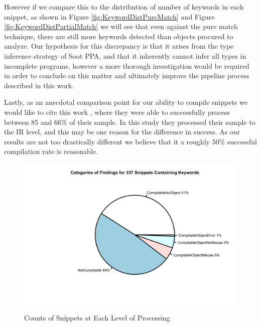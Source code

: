\documentclass[10pt, conference]{IEEEtran}
\begin{document}
However if we compare this to the distribution of number of keywords in each snippet, as shown in Figure \ref{fig:KeywordDistPureMatch} and Figure \ref{fig:KeywordDistPartialMatch} we will see that even against the pure match technique, there are still more keywords detected than objects procured to analyze. Our hypothesis for this discrepancy is that it arises from the type inference strategy of Soot PPA, and that it inherently cannot infer all types in incomplete programs, however a more thorough investigation would be required in order to conclude on this matter and ultimately improve the pipeline process described in this work. 

Lastly, as an anecdotal comparison point for our ability to compile snippets we would like to cite this work \cite{7958574}, where they were able to successfully process between 85 and 66\% of their sample. In this study they processed their sample to the IR level, and this may be one reason for the difference in success. As our results are not too drastically different we believe that it a roughly 50\% successful compilation rate is reasonable.

\begin{figure}[h]
\begin{center}
\includegraphics[width=0.9\linewidth]{PiePartialMatchFull.png}
\caption{Counts of Snippets at Each Level of Processing}
\end{center}
\end{figure}
\end{document}
